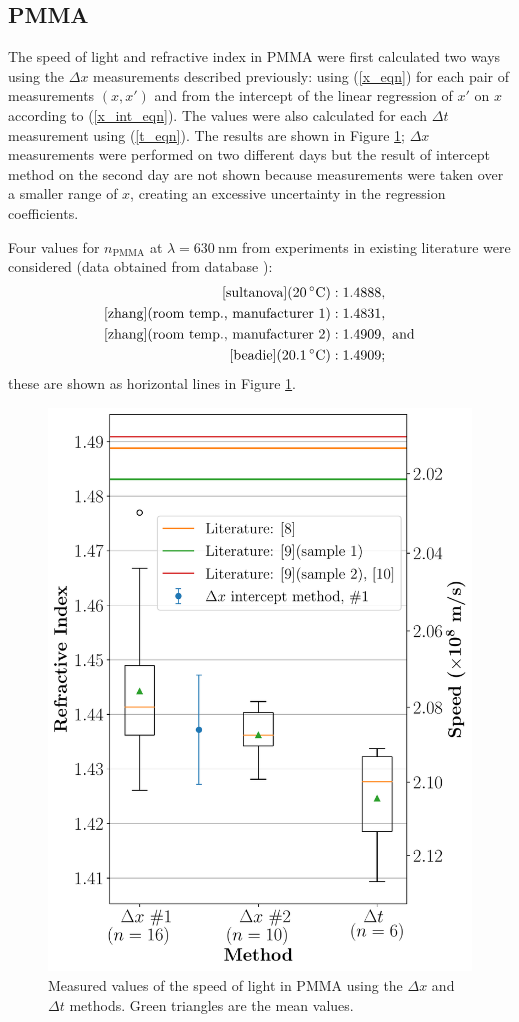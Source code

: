\documentclass[
    aps,
    prl,
    reprint,
    10pt,
    amsmath,
    amssymb,
    a4paper,
    longbibliography
]{revtex4-2}
\begin{document}
\subsection{PMMA}
The speed of light and refractive index in PMMA were first calculated
two ways using the $\Delta x$ measurements described previously: using
(\ref{x_eqn}) for each pair of measurements $(x,x')$ and from the
intercept of the linear regression of $x'$ on $x$ according to
(\ref{x_int_eqn}). The values were also calculated for each $\Delta t$
measurement using (\ref{t_eqn}). The results are shown in Figure
\ref{acrylic_plot}; $\Delta x$ measurements were performed on two different
days but the result of intercept method on the second day are not shown
because measurements were taken over a smaller range of $x$, creating
an excessive uncertainty in the regression coefficients.

Four values for $n_\mathrm{PMMA}$ at $\lambda = \SI{630}{\nano\meter}$
from experiments in existing literature were considered
(data obtained from database \cite{rii}):
\begin{align*}
    \cite{sultanova} (\SI{20}{\celsius}) &: 1.4888, \\
    \cite{zhang} (\text{room temp., manufacturer 1}) &: 1.4831, \\
    \cite{zhang} (\text{room temp., manufacturer 2}) &: 1.4909, \text{ and} \\
    \cite{beadie} (\SI{20.1}{\celsius}) &: 1.4909; \\
\end{align*}
these are shown as horizontal lines in Figure \ref{acrylic_plot}.

\begin{figure}[ht]
    \centering
    \includegraphics[width=0.7\linewidth]{acrylic}
    \caption{Measured values of the speed of light in PMMA using
        the $\Delta x$ and $\Delta t$ methods. Green triangles are
        the mean values.}
    \label{acrylic_plot}
\end{figure}
\end{document}
